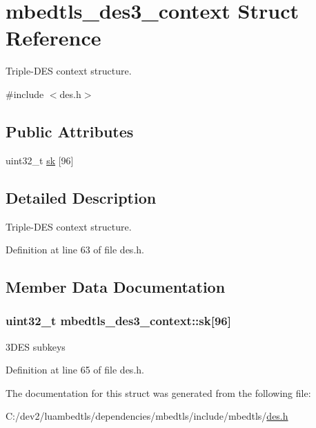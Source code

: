 \hypertarget{structmbedtls__des3__context}{\section{mbedtls\-\_\-des3\-\_\-context Struct Reference}
\label{structmbedtls__des3__context}
}


Triple-\/\-D\-E\-S context structure.  




{\ttfamily \#include $<$des.\-h$>$}

\subsection*{Public Attributes}
\begin{DoxyCompactItemize}
\item 
uint32\-\_\-t \hyperlink{structmbedtls__des3__context_a59ed9ecb227b3d24bddd3993309fb6b4}{sk} \mbox{[}96\mbox{]}
\end{DoxyCompactItemize}


\subsection{Detailed Description}
Triple-\/\-D\-E\-S context structure. 

Definition at line 63 of file des.\-h.



\subsection{Member Data Documentation}
\hypertarget{structmbedtls__des3__context_a59ed9ecb227b3d24bddd3993309fb6b4}{
\subsubsection[{sk}]{\setlength{\rightskip}{0pt plus 5cm}uint32\-\_\-t mbedtls\-\_\-des3\-\_\-context\-::sk\mbox{[}96\mbox{]}}}\label{structmbedtls__des3__context_a59ed9ecb227b3d24bddd3993309fb6b4}
3\-D\-E\-S subkeys 

Definition at line 65 of file des.\-h.



The documentation for this struct was generated from the following file\-:\begin{DoxyCompactItemize}
\item 
C\-:/dev2/luambedtls/dependencies/mbedtls/include/mbedtls/\hyperlink{des_8h}{des.\-h}\end{DoxyCompactItemize}

